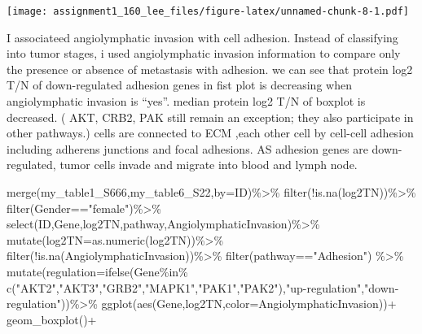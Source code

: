 \documentclass[
]{article}
\newenvironment{Shaded}{\begin{snugshade}}{\end{snugshade}}
\newcommand{\AttributeTok}[1]{\textcolor[rgb]{0.77,0.63,0.00}{#1}}
\newcommand{\FunctionTok}[1]{\textcolor[rgb]{0.00,0.00,0.00}{#1}}
\newcommand{\NormalTok}[1]{#1}
\newcommand{\SpecialCharTok}[1]{\textcolor[rgb]{0.00,0.00,0.00}{#1}}
\newcommand{\StringTok}[1]{\textcolor[rgb]{0.31,0.60,0.02}{#1}}
\begin{document}
\texttt{[image: assignment1\_160\_lee\_files/figure-latex/unnamed-chunk-8-1.pdf]}

I associateed angiolymphatic invasion with cell adhesion. Instead of
classifying into tumor stages, i used angiolymphatic invasion
information to compare only the presence or absence of metastasis with
adhesion. we can see that protein log2 T/N of down-regulated adhesion
genes in fist plot is decreasing when angiolymphatic invasion is
``yes''. median protein log2 T/N of boxplot is decreased. ( AKT, CRB2,
PAK still remain an exception; they also participate in other pathways.)
cells are connected to ECM ,each other cell by cell-cell adhesion
including adherens junctions and focal adhesions. AS adhesion genes are
down-regulated, tumor cells invade and migrate into blood and lymph
node.

\begin{Shaded}
\begin{Highlighting}[]
\FunctionTok{merge}\NormalTok{(my\_table1\_S666,my\_table6\_S22,}\AttributeTok{by=}\StringTok{\textquotesingle{}ID\textquotesingle{}}\NormalTok{)}\SpecialCharTok{\%\textgreater{}\%}
  \FunctionTok{filter}\NormalTok{(}\SpecialCharTok{!}\FunctionTok{is.na}\NormalTok{(log2TN))}\SpecialCharTok{\%\textgreater{}\%}
  \FunctionTok{filter}\NormalTok{(Gender}\SpecialCharTok{==}\StringTok{"female"}\NormalTok{)}\SpecialCharTok{\%\textgreater{}\%}
  \FunctionTok{select}\NormalTok{(ID,Gene,log2TN,pathway,AngiolymphaticInvasion)}\SpecialCharTok{\%\textgreater{}\%} 
  \FunctionTok{mutate}\NormalTok{(}\AttributeTok{log2TN=}\FunctionTok{as.numeric}\NormalTok{(log2TN))}\SpecialCharTok{\%\textgreater{}\%}
  \FunctionTok{filter}\NormalTok{(}\SpecialCharTok{!}\FunctionTok{is.na}\NormalTok{(AngiolymphaticInvasion))}\SpecialCharTok{\%\textgreater{}\%} 
  \FunctionTok{filter}\NormalTok{(pathway}\SpecialCharTok{==}\StringTok{"Adhesion"}\NormalTok{) }\SpecialCharTok{\%\textgreater{}\%} 
  \FunctionTok{mutate}\NormalTok{(}\AttributeTok{regulation=}\FunctionTok{ifelse}\NormalTok{(Gene}\SpecialCharTok{\%in\%} \FunctionTok{c}\NormalTok{(}\StringTok{"AKT2"}\NormalTok{,}\StringTok{"AKT3"}\NormalTok{,}\StringTok{"GRB2"}\NormalTok{,}\StringTok{"MAPK1"}\NormalTok{,}\StringTok{"PAK1"}\NormalTok{,}\StringTok{"PAK2"}\NormalTok{),}\StringTok{"up{-}regulation"}\NormalTok{,}\StringTok{"down{-}regulation"}\NormalTok{))}\SpecialCharTok{\%\textgreater{}\%}
  \FunctionTok{ggplot}\NormalTok{(}\FunctionTok{aes}\NormalTok{(Gene,log2TN,}\AttributeTok{color=}\NormalTok{AngiolymphaticInvasion))}\SpecialCharTok{+}
  \FunctionTok{geom\_boxplot}\NormalTok{()}\SpecialCharTok{+}

\end{Highlighting}
\end{Shaded}
\end{document}
